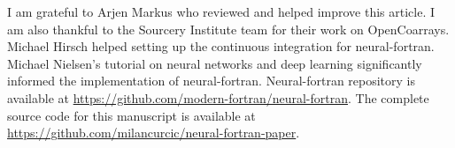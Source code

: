\documentclass[sigplan, review=false, screen=true, balance=true]{acmart}
\begin{document}
\begin{acks}
I am grateful to Arjen Markus who reviewed and helped improve this article.
I am also thankful to the Sourcery Institute team for their work on OpenCoarrays. 
Michael Hirsch helped setting up the continuous integration for neural-fortran. 
Michael Nielsen's tutorial on neural networks and deep learning
significantly informed the implementation of neural-fortran.
Neural-fortran repository is available at
\url{https://github.com/modern-fortran/neural-fortran}.
The complete source code for this manuscript is available at
\url{https://github.com/milancurcic/neural-fortran-paper}.
\end{acks}



\end{document}
